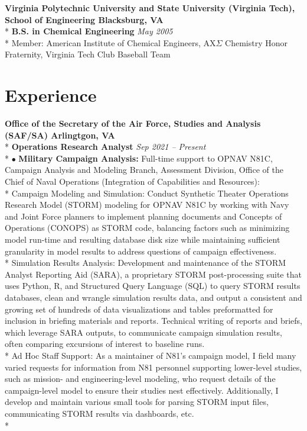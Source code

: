 \documentclass{article}
\begin{document}
\noindent \textbf{Virginia Polytechnic University and State University (Virginia Tech), School of Engineering \hfill Blacksburg, VA} \\*
\textbf{B.S. in Chemical Engineering} \hfill \textit{May 2005} \\*
\textendash Member: American Institute of Chemical Engineers, AX$\Sigma$ Chemistry Honor Fraternity, Virginia Tech Club Baseball Team 

\section{Experience}
\noindent \textbf{Office of the Secretary of the Air Force, Studies and Analysis (SAF/SA) \hfill Arlingtgon, VA} \\*
\textbf{Operations Research Analyst} \hfill \textit{Sep 2021 -- Present} \\*
$\bullet$ \textbf{Military Campaign Analysis:} Full-time support to OPNAV N81C, Campaign Analysis and Modeling Branch, Assessment Division, Office of the Chief of Naval Operations (Integration of Capabilities and Resources):\\*
\indent \textendash Campaign Modeling and Simulation: Conduct Synthetic Theater Operations Research Model (STORM) modeling for OPNAV N81C by working with Navy and Joint Force planners to implement planning documents and Concepts of Operations (CONOPS) as STORM code, balancing factors such as minimizing model run-time and resulting database disk size while maintaining sufficient granularity in model results to address questions of campaign effectiveness.\\*
\indent \textendash Simulation Results Analysis: Development and maintenance of the STORM Analyst Reporting Aid (SARA), a proprietary STORM post-processing suite that uses Python, R, and Structured Query Language (SQL) to query STORM results databases, clean and wrangle simulation results data, and output a consistent and growing set of hundreds of data visualizations and tables preformatted for inclusion in briefing materials and reports. Technical writing of reports and briefs, which leverage SARA outputs, to communicate campaign simulation results, often comparing excursions of interest to baseline runs. \\*
\indent \textendash Ad Hoc Staff Support: As a maintainer of N81's campaign model, I field many varied requests for information from N81 personnel supporting lower-level studies, such as mission- and engineering-level modeling, who request details of the campaign-level model to ensure their studies nest effectively. Additionally, I develop and maintain various small tools for parsing STORM input files, communicating STORM results via dashboards, etc. \\*
\end{document}
